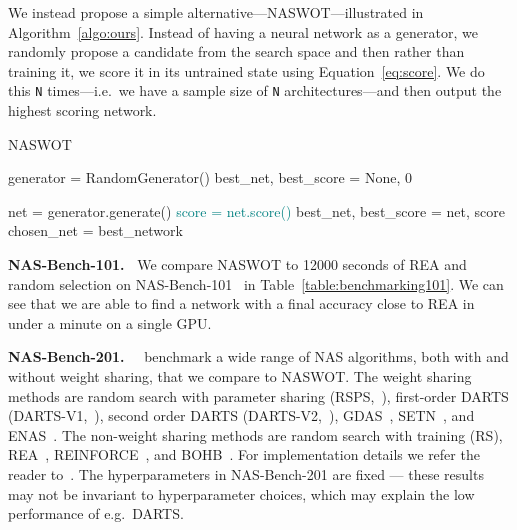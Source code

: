 \documentclass{article}
\begin{document}
We instead propose a simple alternative---NASWOT---illustrated in Algorithm~\ref{algo:ours}. Instead of having a neural network as a generator, we randomly propose a candidate from the search space and then rather than training it, we score it in its untrained state using Equation~\ref{eq:score}. We do this \texttt{N} times---i.e.\ we have a sample size of \texttt{N} architectures---and then output the highest scoring network.


{\tiny
\vspace{-4mm}
    \begin{algorithm}[H]
    \caption{NASWOT}
    \begin{algorithmic}[h]
          \State  generator = RandomGenerator() 
                \State best\_net, best\_score = None, 0 
    

          
              \State net = generator.generate()
        \State \textcolor{teal}{score = net.score()} 
         \State best\_net, best\_score = net, score 
        \EndIf
        \EndFor
    \State chosen\_net = best\_network
    
    
    \end{algorithmic}
    
    \label{algo:ours}
    \end{algorithm}
    
    }




\textbf{NAS-Bench-101.\ } We compare NASWOT to 12000 seconds of REA \citep{real2019regularized} and random selection on NAS-Bench-101~\citep{ying2019bench} in Table~\ref{table:benchmarking101}. We can see that we are able to find a network with a final accuracy close to REA in under a minute on a single GPU. 



\textbf{NAS-Bench-201.\ }~\citet{Dong2020NAS-Bench-201} benchmark a wide range of NAS algorithms, both with and without weight sharing, that we compare to NASWOT. The weight sharing methods are random search with parameter sharing (RSPS,~\citealp{li2019random}), first-order DARTS (DARTS-V1,~\citealp{liu2019darts}), second order DARTS (DARTS-V2,~\citealp{liu2019darts}), GDAS~\citep{dong2019searching}, SETN~\citep{dong2019one}, and ENAS~\citep{pham2018efficient}. The non-weight sharing methods are random search with training (RS), REA~\citep{real2019regularized}, REINFORCE~\citep{williams1992simple}, and BOHB~\citep{falkner2018bohb}. For implementation details we refer the reader to~\cite{Dong2020NAS-Bench-201}. The hyperparameters in NAS-Bench-201 are fixed --- these results may not be invariant to hyperparameter choices, which may explain the low performance of e.g.\ DARTS.
\end{document}
